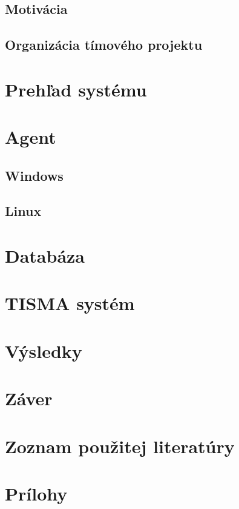 \documentclass[a4paper,12pt]{article}
\begin{document}
\subsection{Motivácia}
\subsection{Organizácia tímového projektu}
\newpage

\section{Prehľad systému}
\newpage
\section{Agent}
\subsection{Windows}

\subsection{Linux}
\newpage

\section{Databáza}
\newpage

\section{TISMA systém}
\newpage

\section{Výsledky}
\newpage

\section*{Záver}
\newpage

\section*{Zoznam použitej literatúry}

\newpage

\section*{Prílohy}

\newpage
\end{document}
